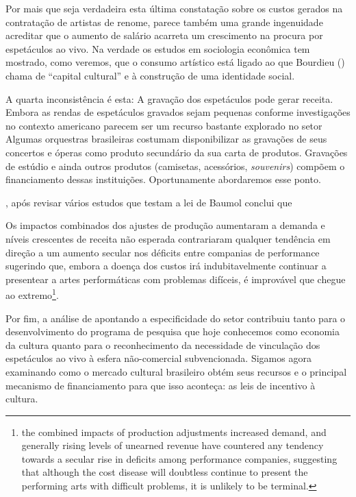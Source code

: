 \documentclass[a4paper, 12pt, openright, oneside, german, french, english, brazil]{abntex2}
\begin{document}
	Por mais que seja verdadeira esta última constatação sobre os custos gerados na contratação de artistas de renome, parece também uma grande ingenuidade acreditar que o aumento de salário acarreta um crescimento na procura por espetáculos ao vivo. Na verdade os estudos em sociologia econômica tem mostrado, como veremos, que o consumo artístico está ligado ao que Bourdieu (\citeyear{bourdieu2011forms,bourdieu2003amor,bourdieu2007distincao}) chama de ``capital cultural'' e à construção de uma identidade social. 
	
	A quarta inconsistência é esta: A gravação dos espetáculos pode gerar receita. Embora as rendas de espetáculos gravados sejam pequenas conforme investigações no contexto americano  parecem ser um recurso bastante explorado no setor Algumas orquestras brasileiras costumam disponibilizar as gravações de seus concertos e óperas como produto secundário da sua carta de produtos. Gravações de estúdio e ainda outros produtos (camisetas, acessórios, \textit{souvenirs}) compõem o financiamento dessas instituições. Oportunamente abordaremos esse ponto.
	
	, após revisar vários estudos que testam a lei de Baumol conclui que
	
	\begin{citacao}
		Os impactos combinados dos ajustes de produção aumentaram a demanda e níveis crescentes de receita não esperada contrariaram qualquer tendência em direção a um aumento secular nos déficits entre companias de performance sugerindo que, embora a doença dos custos irá indubitavelmente continuar a presentear a artes performáticas com problemas difíceis, é improvável que chegue ao extremo\footnote{the combined impacts of production adjustments increased demand, and generally rising levels of unearned revenue have countered any tendency towards a secular rise in deficits among performance companies, suggesting that although the cost disease will doubtless continue to present the performing arts with difficult problems, it is unlikely to be terminal.}. \cite[p. 16]{throsby1994production}
	\end{citacao}
	
	Por fim, a análise de  apontando a especificidade do setor contribuiu tanto para o desenvolvimento do programa de pesquisa que hoje conhecemos como economia da cultura quanto para o reconhecimento da necessidade de vinculação dos espetáculos ao vivo à esfera não-comercial subvencionada. Sigamos agora examinando como o mercado cultural brasileiro obtém seus recursos e o principal mecanismo de financiamento para que isso aconteça: as leis de incentivo à cultura.
	
\end{document}
